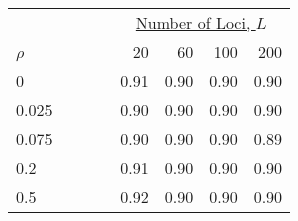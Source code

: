 \begin{tabular}{lrrrr} 
  &  \multicolumn{4}{c}{\underline{Number of Loci, $L$}} \\
$\rho$~~~~~~~~~~  &  20                 &  60                 &  100                &  200                \\  
\hline 0          &  0.91               &  0.90               &  0.90               &  0.90               \\  
0.025              &  0.90               &  0.90               &  0.90               &  0.90               \\  
0.075              &  0.90               &  0.90               &  0.90               &  0.89               \\  
0.2                &  0.91               &  0.90               &  0.90               &  0.90               \\  
0.5                &  0.92               &  0.90               &  0.90               &  0.90               \\  
\end{tabular} 
